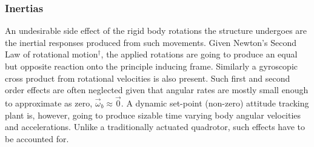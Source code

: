 \subsubsection*{Inertias}
An undesirable side effect of the rigid body rotations the structure undergoes are the inertial responses produced from such movements. Given Newton's Second Law of rotational motion$^{\dagger}$, the applied rotations are going to produce an equal but opposite reaction onto the principle inducing frame. Similarly a gyroscopic cross product from rotational velocities is also present. Such first and second order effects are often neglected given that angular rates are mostly small enough to approximate as zero, $\vec{\omega}_b\approx\vec{0}$. A dynamic set-point (non-zero) attitude tracking plant is, however, going to produce sizable time varying body angular velocities and accelerations. Unlike a traditionally actuated quadrotor, such effects have to be accounted for.
